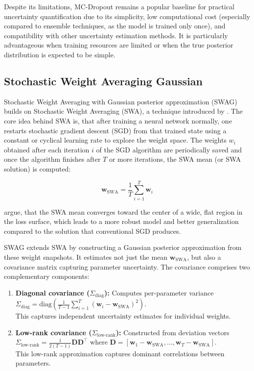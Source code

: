 \vspace{0.15cm}
Despite its limitations, MC-Dropout remains a popular baseline for practical uncertainty quantification
due to its simplicity, low computational cost (especially compared to ensemble techniques, as the model
is trained only once), and compatibility with other uncertainty estimation methods. It is particularly
advantageous when training resources are limited or when the true posterior distribution is expected to be simple.


\subsection{Stochastic Weight Averaging Gaussian}
\label{methodology:swag}
Stochastic Weight Averaging with Gaussian posterior approximation (SWAG) builds on Stochastic Weight
Averaging (SWA), a technique introduced by \citet{izmailov2019swa}. The core idea behind SWA is,
that after training a neural network normally, one restarts stochastic gradient descent (SGD) from that
trained state using a constant or cyclical learning rate to explore the weight space. The weights $w_i$
obtained after each iteration $i$ of the SGD algorithm are periodically saved and once the algorithm
finishes after $T$ or more iterations, the SWA mean (or SWA solution) is computed:

\[
\mathbf{w}_{\mathrm{SWA}} = \frac{1}{T}\sum_{i=1}^T \mathbf{w}_i
\]

\citet{izmailov2019swa} argue, that the SWA mean converges toward the center of a wide, flat region in
the loss surface, which leads to a more robust model and better generalization compared to the solution
that conventional SGD produces.

\vspace{0.15cm}
SWAG \citep{maddox2019swag} extends SWA by constructing a Gaussian posterior approximation from these
weight snapshots. It estimates not just the mean $\mathbf{w}_{\mathrm{SWA}}$, but also a covariance
matrix capturing parameter uncertainty. The covariance comprises two complementary components:

\begin{enumerate}
    \item \textbf{Diagonal covariance ($\Sigma_{\mathrm{diag}}$):} Computes per-parameter variance\\
    $\Sigma_{\mathrm{diag}} = \mathrm{diag}\left(\frac{1}{T-1}\sum_{i=1}^T (\mathbf{w}_i - \mathbf{w}_{\mathrm{SWA}})^2\right)$.\\
    This captures independent uncertainty estimates for individual weights.
          
    \item \textbf{Low-rank covariance ($\Sigma_{\mathrm{low\text{-}rank}}$):} Constructed from deviation
    vectors\\
    $\Sigma_{\mathrm{low\text{-}rank}} = \frac{1}{2(T-1)}\mathbf{D}\mathbf{D}^\top$  
    where $\mathbf{D} = [\mathbf{w}_1 - \mathbf{w}_{\mathrm{SWA}}, \dots, \mathbf{w}_T - \mathbf{w}_{\mathrm{SWA}}]$.\\
    This low-rank approximation captures dominant correlations between parameters.
\end{enumerate}

